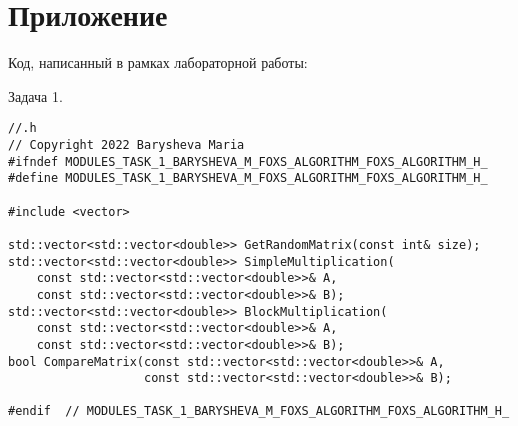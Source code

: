 \documentclass[12pt]{article}
\begin{document}
\section*{Приложение}
Код, написанный в рамках лабораторной работы:
\par Задача 1. 
\begin{lstlisting}
//.h
// Copyright 2022 Barysheva Maria
#ifndef MODULES_TASK_1_BARYSHEVA_M_FOXS_ALGORITHM_FOXS_ALGORITHM_H_
#define MODULES_TASK_1_BARYSHEVA_M_FOXS_ALGORITHM_FOXS_ALGORITHM_H_

#include <vector>

std::vector<std::vector<double>> GetRandomMatrix(const int& size);
std::vector<std::vector<double>> SimpleMultiplication(
    const std::vector<std::vector<double>>& A,
    const std::vector<std::vector<double>>& B);
std::vector<std::vector<double>> BlockMultiplication(
    const std::vector<std::vector<double>>& A,
    const std::vector<std::vector<double>>& B);
bool CompareMatrix(const std::vector<std::vector<double>>& A,
                   const std::vector<std::vector<double>>& B);

#endif  // MODULES_TASK_1_BARYSHEVA_M_FOXS_ALGORITHM_FOXS_ALGORITHM_H_
\end{lstlisting}
\end{document}
